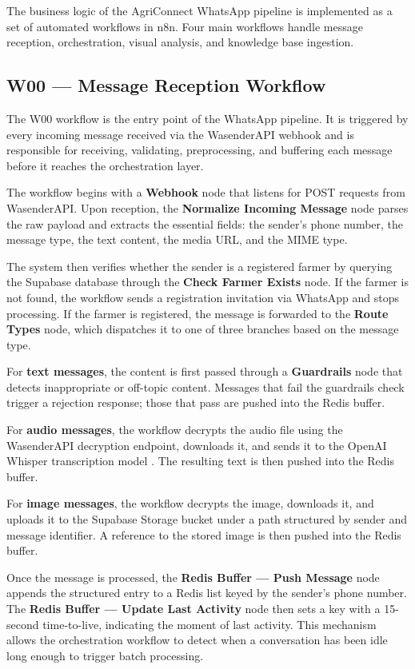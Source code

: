 The business logic of the AgriConnect WhatsApp pipeline is implemented as a set of automated workflows in n8n. Four main workflows handle message reception, orchestration, visual analysis, and knowledge base ingestion.

\subsection{W00 — Message Reception Workflow}

The W00 workflow is the entry point of the WhatsApp pipeline. It is triggered by every incoming message received via the WasenderAPI webhook and is responsible for receiving, validating, preprocessing, and buffering each message before it reaches the orchestration layer.

The workflow begins with a \textbf{Webhook} node that listens for POST requests from WasenderAPI\@. Upon reception, the \textbf{Normalize Incoming Message} node parses the raw payload and extracts the essential fields: the sender's phone number, the message type, the text content, the media URL, and the MIME type.

The system then verifies whether the sender is a registered farmer by querying the Supabase database through the \textbf{Check Farmer Exists} node. If the farmer is not found, the workflow sends a registration invitation via WhatsApp and stops processing. If the farmer is registered, the message is forwarded to the \textbf{Route Types} node, which dispatches it to one of three branches based on the message type.

For \textbf{text messages}, the content is first passed through a \textbf{Guardrails} node that detects inappropriate or off-topic content. Messages that fail the guardrails check trigger a rejection response; those that pass are pushed into the Redis buffer.

For \textbf{audio messages}, the workflow decrypts the audio file using the WasenderAPI decryption endpoint, downloads it, and sends it to the OpenAI Whisper transcription model \cite{openai_whisper2022}. The resulting text is then pushed into the Redis buffer.


For \textbf{image messages}, the workflow decrypts the image, downloads it, and uploads it to the Supabase Storage bucket under a path structured by sender and message identifier. A reference to the stored image is then pushed into the Redis buffer.

Once the message is processed, the \textbf{Redis Buffer — Push Message} node appends the structured entry to a Redis list keyed by the sender's phone number. The \textbf{Redis Buffer — Update Last Activity} node then sets a key with a 15-second time-to-live, indicating the moment of last activity. This mechanism allows the orchestration workflow to detect when a conversation has been idle long enough to trigger batch processing.

